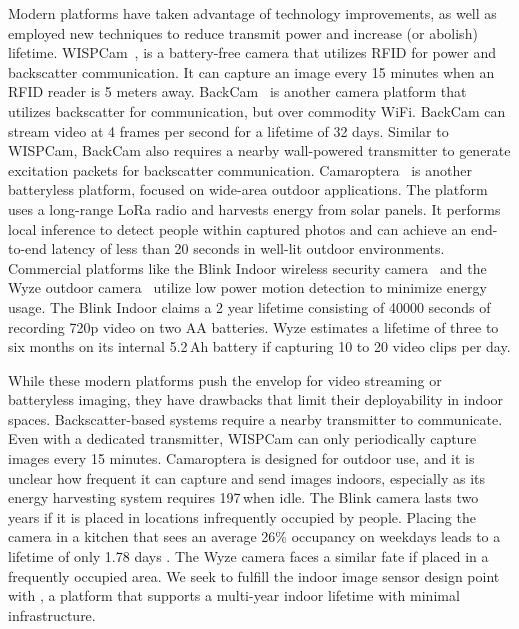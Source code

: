 
Modern platforms have taken advantage of technology improvements, as well as employed new techniques to reduce transmit power and increase (or abolish) lifetime. WISPCam~\cite{naderiparizi2015wispcam}, is a battery-free camera that utilizes RFID for power and backscatter communication. It can capture an image every 15 minutes when an RFID reader is 5 meters away. BackCam~\cite{josephson2019wireless} is  another camera platform that utilizes backscatter for communication, but over commodity WiFi. BackCam can stream video at 4 frames per second for a lifetime of 32 days. Similar to WISPCam, BackCam also requires a nearby wall-powered transmitter to generate excitation packets for backscatter communication. Camaroptera~\cite{nardello2019camaroptera} is another batteryless platform, focused on wide-area outdoor applications. The platform uses a long-range LoRa radio and harvests energy from solar panels. It performs local inference to detect people within captured photos and can achieve an end-to-end latency of less than 20 seconds in well-lit outdoor environments. Commercial platforms like the Blink Indoor wireless security camera~\cite{blinkindoor} and the Wyze outdoor camera~\cite{wyzeoutdoor} utilize low power motion detection to minimize energy usage. The Blink Indoor claims a 2 year lifetime consisting of 40000 seconds of recording 720p video on two AA batteries. Wyze estimates a lifetime of three to six months on its internal 5.2\,Ah battery if capturing 10 to 20 video clips per day.

While these modern platforms push the envelop for video streaming or batteryless imaging, they have drawbacks that limit their deployability in indoor spaces. Backscatter-based systems require a nearby transmitter to communicate. Even with a dedicated transmitter, WISPCam can only periodically capture images every 15 minutes. Camaroptera is designed for outdoor use, and it is unclear how frequent it can capture and send images indoors, especially as its energy harvesting system requires 197\,\uW when idle. The Blink camera lasts two years if it is placed in locations infrequently occupied by people. Placing the camera in a kitchen that sees an average 26\% occupancy on weekdays leads to a lifetime of only 1.78 days \cite{josephson2019wireless}. The Wyze camera faces a similar fate if placed in a frequently occupied area.
We seek to fulfill the indoor image sensor design point with \name{}, a platform that supports a multi-year indoor lifetime with minimal infrastructure.